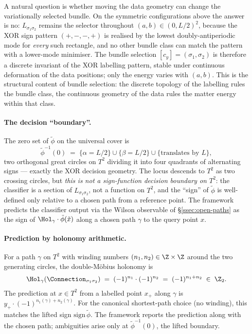 \begin{remark}
\label{rem:T2-bundle-stability}
A natural question is whether moving the data geometry can change
the variationally selected bundle. On the symmetric configurations
above the answer is no: $L_{\sigma_1\sigma_2}$ remains the selector
throughout $(a,b)\in(0,L/2)^2$, because the XOR sign pattern
$(+,-,-,+)$ is realised by the lowest doubly-antiperiodic mode for
\emph{every} such rectangle, and no other bundle class can match
the pattern with a lower-mode minimiser. The bundle selection
$[c_y]=(\sigma_1,\sigma_2)$ is therefore a discrete invariant of
the XOR labelling pattern, stable under continuous deformation of
the data positions; only the energy varies with $(a,b)$. This is
the structural content of bundle selection: the discrete topology
of the labelling rules the bundle class, the continuous geometry
of the data rules the matter energy within that class.
\end{remark}

\paragraph{The decision ``boundary''.} The zero set of $\tilde\phi$
on the universal cover is
\[
   \tilde\phi^{-1}(0)
   \;=\;
   \{\alpha=L/2\}\cup\{\beta=L/2\}\cup\{\text{translates by }L\},
\]
two orthogonal great circles on $T^2$ dividing it into four
quadrants of alternating signs --- exactly the XOR decision
geometry. The locus descends to $T^2$ as two crossing circles, but
\emph{this is not a sign-function decision boundary on $T^2$}: the
classifier is a section of $L_{\sigma_1\sigma_2}$, not a function
on $T^2$, and the ``sign'' of $\tilde\phi$ is well-defined only
relative to a chosen path from a reference point. The framework
predicts the classifier output via the Wilson observable of
\S\ref{ssec:open-paths} as the sign of
$\Hol_\gamma\cdot\tilde\phi(\tilde x)$ along a chosen path $\gamma$
to the query point $x$.

\paragraph{Prediction by holonomy arithmetic.} For a path $\gamma$
on $T^2$ with winding numbers $(n_1,n_2)\in\Z\times\Z$ around the
two generating circles, the double-M\"obius holonomy is
\[
   \Hol_\gamma(\Connection_{\sigma_1\sigma_2}) \;=\;
   (-1)^{n_1}\cdot(-1)^{n_2} \;=\; (-1)^{n_1+n_2} \;\in\;\Z_2.
\]
The prediction at $x\in T^2$ from a labelled point $x_+$ along
$\gamma$ is $y_+\cdot(-1)^{n_1(\gamma)+n_2(\gamma)}$. For the
canonical shortest-path choice (no winding), this matches the
lifted sign $\mathrm{sign}\,\tilde\phi$. The framework reports the
prediction along with the chosen path; ambiguities arise only at
$\tilde\phi^{-1}(0)$, the lifted boundary.

